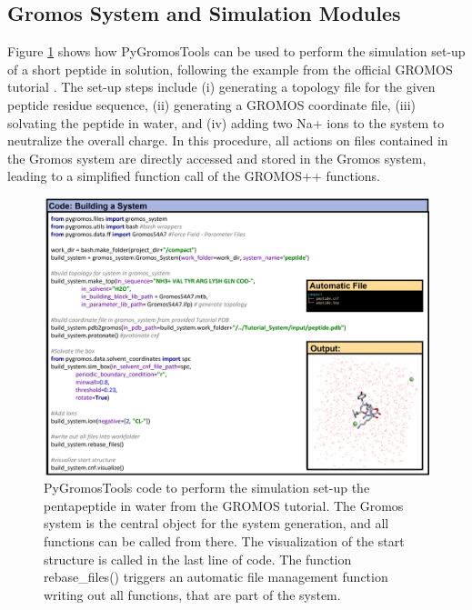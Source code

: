 \subsection{Gromos System and Simulation Modules}
Figure \ref{fig: GROMOSSystemExample} shows how PyGromosTools can be used to perform the simulation set-up of a short peptide in solution, following the example from the official GROMOS tutorial \cite{Lier2020}. The set-up steps include (i) generating a topology file for the given peptide residue sequence, (ii) generating a GROMOS coordinate file, (iii) solvating the peptide in water, and (iv) adding two Na+ ions to the system to neutralize the overall charge. In this procedure, all actions on files contained in the Gromos system are directly accessed and stored in the Gromos system, leading to a simplified function call of the GROMOS++ functions. 

\begin{figure}[h]
    \centering
    \includegraphics[width=\textwidth]{fig/ApplicationExamples/codeExample_GROMOSSystemSolvBoxTut.png}
    \caption{PyGromosTools code to perform the simulation set-up the pentapeptide in water from the GROMOS tutorial\cite{Lier2020}. The Gromos system is the central object for the system generation, and all functions can be called from there. The visualization of the start structure is called in the last line of code. The function rebase\_files() triggers an automatic file management function writing out all functions, that are part of the system.}
    \label{fig: GROMOSSystemExample}
\end{figure}

